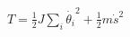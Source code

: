 \documentclass{article}
\begin{document}
	
$
T = \frac{1}{2}J\sum_i\dot{\theta_i}^2 + \frac{1}{2}m \dot{s}^2
$
\end{document}
